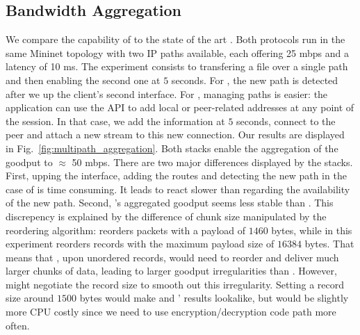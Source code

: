 

\subsection{Bandwidth Aggregation}

We compare the capability of \tcpls to the state of the art \mptcp. Both
protocols run in the same Mininet topology with two IP paths available, each
offering 25 mbps and a latency of 10 ms. The experiment consists to transfering
a file over a single path and then enabling the second one at $5$ seconds. For
\mptcp, the new path is detected after we up the client's second interface. For
\tcpls, managing paths is easier: the application can use the API to add local
or peer-related addresses at any point of the session. In that case, we add
the information at $5$ seconds, connect to the peer and attach a new stream to
this new connection. Our results are displayed in
Fig.~\ref{fig:multipath_aggregation}. Both stacks enable the aggregation of the
goodput to  $\approx$ 50 mbps. There are two major differences displayed by the stacks.
First, upping the interface, adding the routes and detecting the new path in
the case of \mptcp is time consuming. It leads \mptcp to react slower than
\tcpls regarding the availability of the new path. Second, \tcpls's aggregated
goodput seems less stable than \mptcp. This discrepency is explained by the
difference of chunk size manipulated by the reordering algorithm: \mptcp
reorders packets with a payload of $1460$ bytes, while \tcpls in this experiment
reorders records with the maximum payload size of $16384$ bytes. That means
that \tcpls, upon unordered records, would need to reorder and deliver much
larger chunks of data, leading to larger goodput irregularities than \mptcp.
However, \tcpls might  negotiate the record size to smooth out this
irregularity. Setting a record size around $1500$ bytes would make \mptcp and
\tcpls' results lookalike, but would be slightly more CPU costly since we need
to use encryption/decryption code path more often.

